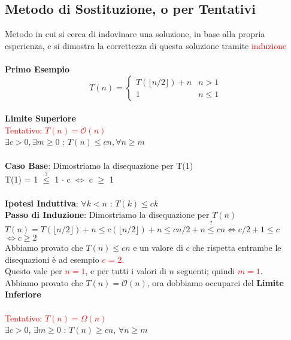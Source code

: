 \documentclass[../cheatSheetAlgoritmi.tex]{subfiles}
\begin{document}
\subsection{Metodo di Sostituzione, o per Tentativi}
Metodo in cui si cerca di indovinare una soluzione, in base alla propria esperienza, e si dimostra la correttezza di questa soluzione tramite \textcolor{red}{induzione}\\\\
\textbf{Primo Esempio}
	\begin{equation*}
  		T(n)=\begin{cases}
    		T(\lfloor n/2 \rfloor) + n & \text{$n > 1$}\\
    		1 & \text{$n \leq 1$}
  		\end{cases}
	\end{equation*}
\hfill\\
\textbf{Limite Superiore}\\
\textcolor{red}{Tentativo: $T(n) = \mathcal{O}(n)$}\\
$\exists c > 0, \exists m \geq 0$ : $T(n) \leq cn, \forall n \geq m$\\\\
\textbf{Caso Base}: Dimostriamo la disequazione per T(1)\\
T(1) = 1 $\stackrel{?}{\leq}$ 1 $\cdot$ c $\iff$ c $\geq$ 1\\\\
\textbf{Ipotesi Induttiva}: $\forall k < n$ : $T(k) \leq ck$\\
\textbf{Passo di Induzione}: Dimostriamo la disequazione per $T(n)$\\
$T(n) =  T(\lfloor n/2 \rfloor) + n \leq c( \lfloor n/2 \rfloor) + n \leq cn/2 + n \stackrel{?}{\leq} cn \iff  c/2 + 1 \leq c$\\
$\iff c \geq 2$\\
Abbiamo provato che $T(n) \leq cn$ e un valore di $c$ che rispetta entrambe le disequazioni è ad esempio \textcolor{red}{$c$ = 2}.\\
Questo vale per \textcolor{red}{$n = 1$}, e per tutti i valori di $n$ seguenti; quindi \textcolor{red}{$m = 1$}.\\
Abbiamo provato che $T(n) = \mathcal{O}(n)$, ora dobbiamo occuparci del \textbf{Limite Inferiore}\\\\
\textcolor{red}{Tentativo: $T(n) = \Omega(n)$}\\
$\exists c > 0$, $\exists m \geq 0$ : $T(n) \geq cn$, $\forall n \geq m$\\\\
\end{document}
